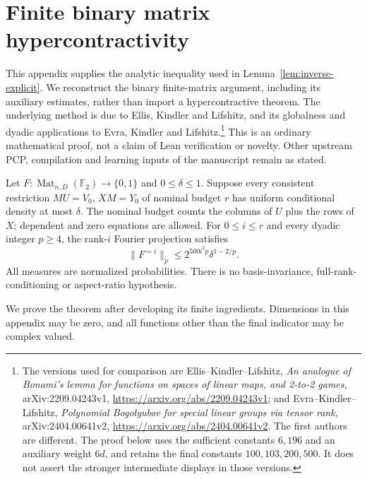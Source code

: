 \appendix
\section{Finite binary matrix hypercontractivity}\label{app:binary-hc}
This appendix supplies the analytic inequality used in
Lemma~\ref{lem:inverse-explicit}. We reconstruct the binary finite-matrix
argument, including its auxiliary estimates, rather than import a
hypercontractive theorem. The underlying method is due to Ellis, Kindler
and Lifshitz, and its globalness and dyadic applications to Evra, Kindler
and Lifshitz.\footnote{The versions used for comparison are
Ellis--Kindler--Lifshitz, \emph{An analogue of Bonami's lemma for functions
on spaces of linear maps, and 2-to-2 games}, arXiv:2209.04243v1,
\url{https://arxiv.org/abs/2209.04243v1}; and
Evra--Kindler--Lifshitz, \emph{Polynomial Bogolyubov for special linear
groups via tensor rank}, arXiv:2404.00641v2,
\url{https://arxiv.org/abs/2404.00641v2}. The first authors are different.
The proof below uses the sufficient constants $6,196$ and an auxiliary
weight $6d$, and retains the final constants $100,103,200,500$. It does not
assert the stronger intermediate displays in those versions.}
This is an ordinary mathematical proof, not a claim of Lean verification
or novelty. Other upstream PCP, compilation and learning inputs of the
manuscript remain as stated.

\begin{theorem}\label{thm:binary-hc}
Let $F:\operatorname{Mat}_{n,D}(\mathbb F_2)\to\{0,1\}$ and
$0\le\delta\le1$. Suppose every consistent restriction
$MU=V_0$, $XM=Y_0$ of nominal budget $r$ has uniform conditional density
at most $\delta$. The nominal budget counts the columns of $U$ plus the
rows of $X$; dependent and zero equations are allowed. For $0\le i\le r$
and every dyadic integer $p\ge4$, the rank-$i$ Fourier projection satisfies
\[
 \|F^{=i}\|_p\le 2^{500i^2p}\delta^{1-2/p}.
\]
All measures are normalized probabilities. There is no basis-invariance,
full-rank-conditioning or aspect-ratio hypothesis.
\end{theorem}
We prove the theorem after developing its finite ingredients. Dimensions
in this appendix may be zero, and all functions other than the final
indicator may be complex valued.

